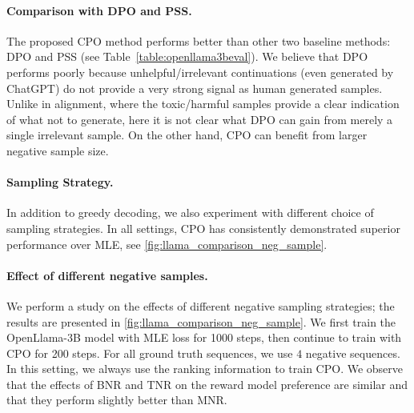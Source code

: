 \paragraph{Comparison with DPO and PSS.} The proposed CPO method performs better than other two baseline methods: DPO and PSS   (see Table~\ref{table:openllama3beval}).
We believe that DPO performs poorly because unhelpful/irrelevant continuations (even generated by ChatGPT) do not provide a very strong signal as human generated samples. Unlike in alignment, where the toxic/harmful samples provide a clear indication of what not to generate, here it is not clear what DPO can gain from merely a single irrelevant sample. On the other hand, CPO can benefit from larger negative sample size. 
\vspace{-5pt}
\paragraph{Sampling Strategy.} In addition to greedy decoding, we also experiment with different choice of sampling strategies. In all settings, CPO has consistently demonstrated superior performance over MLE, see \cref{fig:llama_comparison_neg_sample}.


\vspace{-5pt}
\paragraph{Effect of different negative samples.} We perform a study on the effects of different negative sampling strategies; the results are presented in \cref{fig:llama_comparison_neg_sample}. We first train the OpenLlama-3B model with MLE loss for 1000 steps, then continue to train with CPO for 200 steps. For all ground truth sequences, we use $4$ negative sequences. In this setting, we always use the ranking information to train CPO. We observe that the effects of BNR and TNR on the reward model preference are similar and that they perform slightly better than MNR. 






